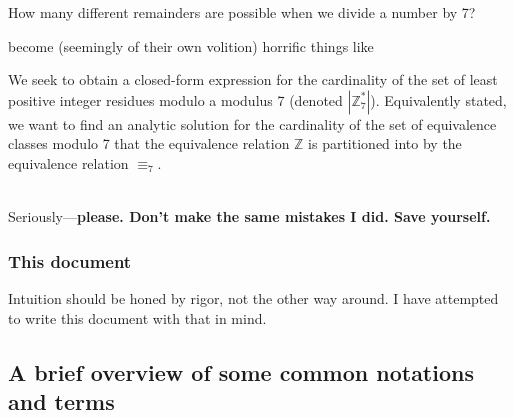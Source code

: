 \documentclass[10pt]{article}
\newcommand\ZZ{{\mathbb Z}}
\theoremstyle{definition}
\begin{document}
\begin{center}
How many different remainders are possible when we divide a number by 7?
\end{center}
become (seemingly of their own volition) horrific things like \\
\begin{adjustwidth}{.05\linewidth}{}
We seek to obtain a closed-form expression for the cardinality of the set of least positive integer residues modulo a modulus 7 (denoted $|\ZZ_7^*|$).  Equivalently stated, we want to find an analytic solution for the cardinality of the set of equivalence classes modulo 7 that the equivalence relation $\ZZ$ is partitioned into by the equivalence relation $\equiv_7$. 
\end{adjustwidth}~\\
Seriously---\textbf{please.  Don't make the same mistakes I did.  Save yourself.}  
\subsubsection{This document}
Intuition should be honed by rigor, not the other way around.  I have attempted to write this document with that in mind.  
\subsection{A brief overview of some common notations and terms}
\end{document}
